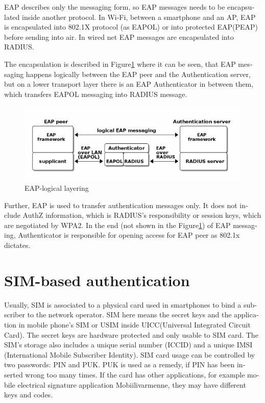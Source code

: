 \documentclass[12pt,a4paper,english]{tutthesis}
\begin{document}
\begin{otherlanguage}{english}
EAP describes only the messaging form, so EAP messages needs to
be encapsulated inside another protocol.  In Wi-Fi, between a smartphone
and an AP, EAP is encapsulated into 802.1X protocol (as EAPOL) or
into protected EAP(PEAP)\cite{peap} before sending
into air. In wired net EAP messages are encapsulated into RADIUS.

The encapsulation is described in Figure\ref{fig:eap-layers} where it
can be seen, that EAP messaging happens logically between the EAP peer
and the
Authentication server, but on a lower transport layer there is an EAP
Authenticator in between them, which transfers EAPOL messaging into
RADIUS message.





\begin{figure}[htb]
\centering
\includegraphics[width=.9\linewidth]{eap-layer.png}
\caption{\label{fig:eap-layers}EAP-logical layering}
\end{figure}


Further, EAP is used to transfer authentication messages only.
It does not include AuthZ information, which is RADIUS's
responsibility or session keys, which are negotiated by WPA2.  In the
end (not shown in the Figure\ref{fig:eap-layers}) of EAP messaging,
Authenticator is responsible for opening access for EAP peer as 802.1x
dictates.



\section{SIM-based authentication}
\label{sec-2-5}
\label{sec:sim-based-auth}
Usually, SIM is associated to a physical card used in smartphones to
bind a subscriber to the network operator.
SIM here means the secret keys and the application in mobile phone's
SIM or USIM inside UICC(Universal Integrated Circuit Card).
The secret keys are hardware protected and only usable to SIM card.
The SIM's storage also includes a unique serial number (ICCID) and a
unique IMSI (International Mobile Subscriber Identity).  SIM card usage
can be controlled by two passwords: PIN and PUK.  PUK is used as a
remedy, if PIN has been inserted wrong too many times.  If the card
has other applications, for example mobile electrical signature
application Mobiilivarmenne, they may have different keys and codes.



\end{otherlanguage}
\end{document}

